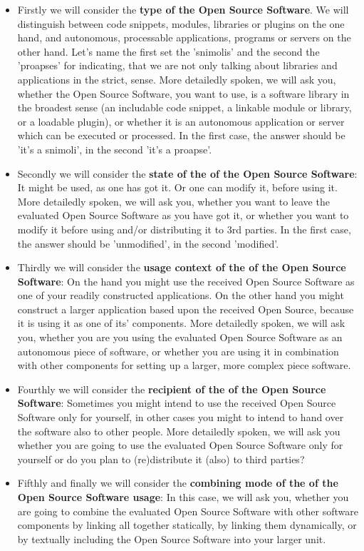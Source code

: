 \begin{itemize}
  \item Firstly we will consider the \textbf{type of the Open Source Software}.
  We will distinguish between code snippets, modules, libraries or plugins on
  the one hand, and autonomous, processable applications, programs or servers on
  the other hand. Let's name the first set the 'snimolis' and the second the
  'proapses' for indicating, that we are not only talking about libraries and
  applications in the strict, sense. More detailedly spoken, we will ask you,
  whether the Open Source Software, you want to use, is a software library in
  the broadest sense (an includable code snippet, a linkable module or library,
  or a loadable plugin), or whether it is an autonomous application or server
  which can be executed or processed. In the first case, the answer should be
  'it's a snimoli', in the second 'it's a proapse'.
  \item Secondly we will consider the \textbf{state of the of the Open Source
  Software}: It might be used, as one has got it. Or one can modify it, before
  using it. More detailedly spoken, we will ask you, whether you want to leave
  the evaluated Open Source Software as you have got it, or whether you want to
  modify it before using and/or distributing it to 3rd parties. In the first
  case, the answer should be 'unmodified', in the second 'modified'.
  \item Thirdly we will consider the \textbf{usage context of the of the Open
  Source Software}: On the hand you might use the received Open Source Software
  as one of your readily constructed applications. On the other hand you might
  construct a larger application based upon the received Open Source, because it
  is using it as one of its' components. More detailedly spoken, we will ask
  you, whether you are you using the evaluated Open Source Software as an
  autonomous piece of software, or whether you are using it in combination
  with other components for setting up a larger, more complex piece software.
  \item Fourthly we will consider the \textbf{recipient of the of the Open
  Source Software}: Sometimes you might intend to use the received Open
  Source Software only for yourself, in other cases you might to intend to
  hand over the software also to other people. More detailedly spoken, we will
  ask you whether you are going to use the evaluated Open Source Software only
  for yourself or do you plan to (re)distribute it (also) to third parties?
  \item Fifthly and finally we will consider the \textbf{combining mode of the
  of the Open Source Software usage}: In this case, we will ask you, whether you
  are going to combine the evaluated Open Source Software with other
  software components by linking all together statically, by linking them
  dynamically, or by textually including the Open Source Software into your
  larger unit.
\end{itemize}

